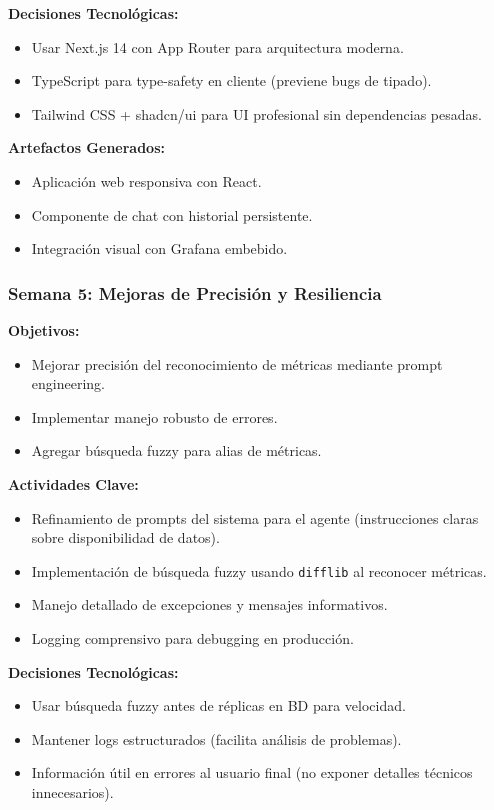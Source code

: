 \documentclass[11pt, a4paper]{report}
\begin{document}
\textbf{Decisiones Tecnológicas:}
\begin{itemize}
    \item Usar Next.js 14 con App Router para arquitectura moderna.
    \item TypeScript para type-safety en cliente (previene bugs de tipado).
    \item Tailwind CSS + shadcn/ui para UI profesional sin dependencias pesadas.
\end{itemize}

\textbf{Artefactos Generados:}
\begin{itemize}
    \item Aplicación web responsiva con React.
    \item Componente de chat con historial persistente.
    \item Integración visual con Grafana embebido.
\end{itemize}

\subsubsection{Semana 5: Mejoras de Precisión y Resiliencia}

\textbf{Objetivos:}
\begin{itemize}
    \item Mejorar precisión del reconocimiento de métricas mediante prompt engineering.
    \item Implementar manejo robusto de errores.
    \item Agregar búsqueda fuzzy para alias de métricas.
\end{itemize}

\textbf{Actividades Clave:}
\begin{itemize}
    \item Refinamiento de prompts del sistema para el agente (instrucciones claras sobre disponibilidad de datos).
    \item Implementación de búsqueda fuzzy usando \texttt{difflib} al reconocer métricas.
    \item Manejo detallado de excepciones y mensajes informativos.
    \item Logging comprensivo para debugging en producción.
\end{itemize}

\textbf{Decisiones Tecnológicas:}
\begin{itemize}
    \item Usar búsqueda fuzzy antes de réplicas en BD para velocidad.
    \item Mantener logs estructurados (facilita análisis de problemas).
    \item Información útil en errores al usuario final (no exponer detalles técnicos innecesarios).
\end{itemize}
\end{document}
